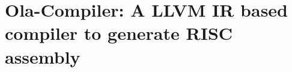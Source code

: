 \section{Ola-Compiler: A LLVM IR based compiler to generate RISC assembly}\label{sec:ola-compiler}




